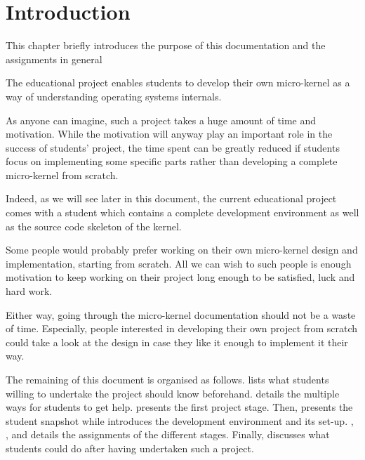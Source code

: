 %
%
%
%
%
%

%
%

\chapter{Introduction}
\label{chapter:introduction}

This chapter briefly introduces the purpose of this documentation
and the assignments in general

\newpage

%
%

The  educational project enables students to develop their own
micro-kernel as a way of understanding operating systems internals.

As anyone can imagine, such a project takes a huge amount of time and
motivation. While the motivation will anyway play an important role in the
success of students' project, the time spent can be greatly reduced if
students focus on implementing some specific parts rather than developing a
complete micro-kernel from scratch.

Indeed, as we will see later in this document, the current 
educational project comes with a student  which contains
a complete development environment as well as the source code skeleton of
the kernel.

Some people would probably prefer working on their own micro-kernel design
and implementation, starting from scratch. All we can wish to such people
is enough motivation to keep working on their project long enough to be
satisfied, luck and hard work.

Either way, going through the  micro-kernel documentation
should not be a waste of time. Especially, people interested in developing
their own project from scratch could take a look at the  design
in case they like it enough to implement it their way.

The remaining of this document is organised as follows.  lists what students willing to undertake the
project should know beforehand. 
details the multiple ways for students to get help.  presents the first project stage. Then,  presents the student snapshot while  introduces the development environment and its set-up.
, ,
 and  details the assignments of the different stages. Finally,
 discusses what students could do
after having undertaken such a project.
